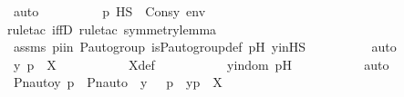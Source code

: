 \begin{isabellebody}
\ auto\isanewline
\ \ \ \ \ \ \isamarkupfalse%
\ \isamarkupfalse%
\ {\isachardoublequoteopen}p{\isacharprime}{\kern0pt}\ {\isasymtturnstile}HS\ {\isasymphi}\ Cons{\isacharparenleft}{\kern0pt}y{\isacharprime}{\kern0pt}{\isacharcomma}{\kern0pt}\ env{\isacharparenright}{\kern0pt}{\isachardoublequoteclose}\ \isanewline
\ \ \ \ \ \ \ \ \isamarkupfalse%
{\isacharparenleft}{\kern0pt}rule{\isacharunderscore}{\kern0pt}tac\ iffD{}{\isacharcomma}{\kern0pt}\ rule{\isacharunderscore}{\kern0pt}tac\ symmetry{\isacharunderscore}{\kern0pt}lemma{\isacharparenright}{\kern0pt}\isanewline
\ \ \ \ \ \ \ \ \isamarkupfalse%
\ assms\ piin{\isasymG}\ {\isasymG}{\isacharunderscore}{\kern0pt}P{\isacharunderscore}{\kern0pt}auto{\isacharunderscore}{\kern0pt}group\ is{\isacharunderscore}{\kern0pt}P{\isacharunderscore}{\kern0pt}auto{\isacharunderscore}{\kern0pt}group{\isacharunderscore}{\kern0pt}def\ p{\isacharprime}{\kern0pt}H\ y{\isacharprime}{\kern0pt}inHS\isanewline
\ \ \ \ \ \ \ \ \isamarkupfalse%
\ auto\isanewline
\ \ \ \ \ \ \isamarkupfalse%
\ \isamarkupfalse%
\ {\isachardoublequoteopen}{\isacharless}{\kern0pt}y{\isacharprime}{\kern0pt}{\isacharcomma}{\kern0pt}\ p{\isacharprime}{\kern0pt}{\isachargreater}{\kern0pt}\ {\isasymin}\ X{\isachardoublequoteclose}\ \isanewline
\ \ \ \ \ \ \ \ \isamarkupfalse%
\ X{\isacharunderscore}{\kern0pt}def\ \isanewline
\ \ \ \ \ \ \ \ \isamarkupfalse%
\ y{\isacharprime}{\kern0pt}indom\ p{\isacharprime}{\kern0pt}H\ \isanewline
\ \ \ \ \ \ \ \ \isamarkupfalse%
\ auto\isanewline
\ \ \ \ \ \ \isamarkupfalse%
\ \isamarkupfalse%
\ {\isachardoublequoteopen}{\isacharless}{\kern0pt}Pn{\isacharunderscore}{\kern0pt}auto{\isacharparenleft}{\kern0pt}{\isasympi}{\isacharparenright}{\kern0pt}{\isacharbackquote}{\kern0pt}y{\isacharprime}{\kern0pt}{\isacharcomma}{\kern0pt}\ {\isasympi}{\isacharbackquote}{\kern0pt}p{\isacharprime}{\kern0pt}{\isachargreater}{\kern0pt}\ {\isasymin}\ {\isacharbraceleft}{\kern0pt}{\isasymlangle}Pn{\isacharunderscore}{\kern0pt}auto{\isacharparenleft}{\kern0pt}{\isasympi}{\isacharparenright}{\kern0pt}\ {\isacharbackquote}{\kern0pt}\ y{\isacharcomma}{\kern0pt}\ {\isasympi}\ {\isacharbackquote}{\kern0pt}\ p{\isasymrangle}\ {\isachardot}{\kern0pt}\ {\isasymlangle}y{\isacharcomma}{\kern0pt}p{\isasymrangle}\ {\isasymin}\ X{\isacharbraceright}{\kern0pt}{\isachardoublequoteclose}\ \isanewline
\ \ \ \ \ \ \ \ \isamarkupfalse%

\end{isabellebody}
